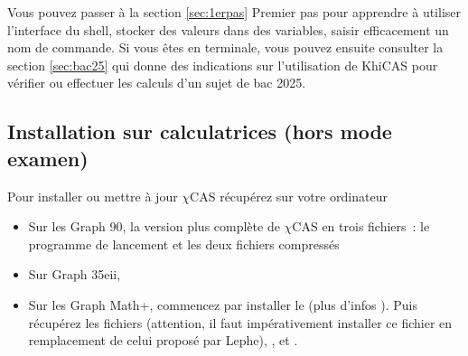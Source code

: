 \documentclass{article}
\begin{document}
\begin{giacjshere}
Vous pouvez passer à la section \ref{sec:1erpas} Premier pas pour
apprendre à utiliser l'interface du shell, stocker des valeurs
dans des variables, saisir efficacement un nom de commande.
Si vous êtes en terminale, vous pouvez ensuite consulter
la section \ref{sec:bac25}
qui donne des indications sur l'utilisation de KhiCAS
pour vérifier ou effectuer les calculs d'un sujet de bac 2025. 

\subsection{Installation sur calculatrices (hors mode examen)} 
Pour installer ou mettre \`a jour $\chi$CAS
r\'ecup\'erez sur votre ordinateur 
\begin{itemize}
\item Sur les Graph 90, la version plus compl\`ete de $\chi$CAS
en trois fichiers~: le programme de lancement
et les deux fichiers compressés
\item Sur Graph 35eii,
\item Sur les Graph Math+, commencez par installer le
(plus d'infos ). 
Puis récupérez les fichiers
 (attention, il faut impérativement installer ce fichier
en remplacement de celui proposé par Lephe),
,
 et
.
\end{itemize}


\end{giacjshere}
\end{document}
